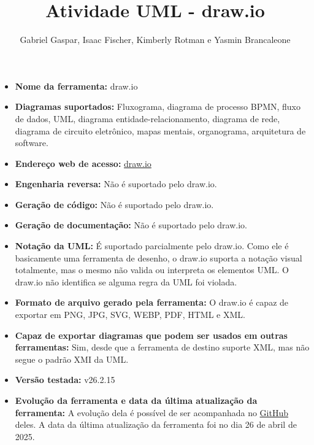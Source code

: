 \documentclass{article}
\title{Atividade UML - draw.io}
\author{Gabriel Gaspar, Isaac Fischer, Kimberly Rotman e Yasmin Brancaleone}
\date{}
\begin{document}
\maketitle

\begin{itemize}[leftmargin=*, itemsep=0.4em]
  \item \textbf{Nome da ferramenta:} draw.io

  \item \textbf{Diagramas suportados:} Fluxograma, diagrama de processo BPMN, fluxo de dados, UML, diagrama entidade-relacionamento, diagrama de rede, diagrama de circuito eletrônico, mapas mentais, organograma, arquitetura de software.

  \item \textbf{Endereço web de acesso:} \href{https://draw.io}{draw.io}

  \item \textbf{Engenharia reversa:} Não é suportado pelo draw.io.

  \item \textbf{Geração de código:} Não é suportado pelo draw.io.

  \item \textbf{Geração de documentação:} Não é suportado pelo draw.io.

  \item \textbf{Notação da UML:} É suportado parcialmente pelo draw.io. Como ele é basicamente uma ferramenta de desenho, o draw.io suporta a notação visual totalmente, mas o mesmo não valida ou interpreta os elementos UML. O draw.io não identifica se alguma regra da UML foi violada.

  \item \textbf{Formato de arquivo gerado pela ferramenta:} O draw.io é capaz de exportar em PNG, JPG, SVG, WEBP, PDF, HTML e XML.

  \item \textbf{Capaz de exportar diagramas que podem ser usados em outras ferramentas:} Sim, desde que a ferramenta de destino suporte XML, mas não segue o padrão XMI da UML.

  \item \textbf{Versão testada:} v26.2.15

  \item \textbf{Evolução da ferramenta e data da última atualização da ferramenta:} A evolução dela é possível de ser acompanhada no \href{https://github.com/jgraph/drawio}{GitHub} deles. A data da última atualização da ferramenta foi no dia 26 de abril de 2025.


\end{itemize}
\end{document}
